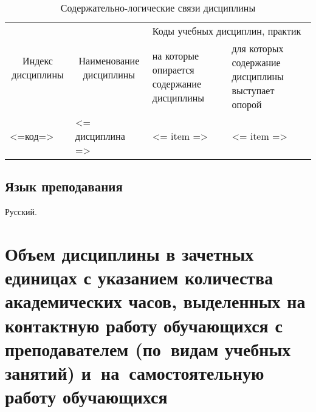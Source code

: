 \documentclass[a4paper,12pt]{article}
\begin{document}
  \begin{table}[H]
  \setlength\arraycolsep{3pt}
  \caption{Содержательно-логические связи дисциплины}
  \begin{tabular}{|l|p{18ex}|*{2}{p{23ex}|}}
  \hline
  \multicolumn{1}{|c|}{\multirow{2}{13ex}{\centering Индекс \linebreak дисциплины}} &
  \multicolumn{1}{c|}{\multirow{2}{18ex}{\centering Наименование \linebreak дисциплины}} & 
  \multicolumn{2}{p{46ex}|}{\centering Коды учебных дисциплин, практик} \\
  \cline{3-4}
   & & 
  \centering на которые опирается содержание дисциплины & 
  \centering\arraybackslash для которых содержание дисциплины выступает опорой
  \\ \hline
  <=код=> & <= дисциплина => 
  & 
  \raggedright
  <= item =>%
  & 
  \raggedright\arraybackslash
  <= item =>%
  \\ \hline
  \end{tabular}
  \end{table}


\subsection{Язык преподавания} 
  Русский.
  



\newpage

\section{Объем дисциплины в зачетных единицах с указанием количества академических часов, выделенных на контактную работу обучающихся с преподавателем (по~видам учебных занятий) и~на~самостоятельную работу обучающихся}
\end{document}
